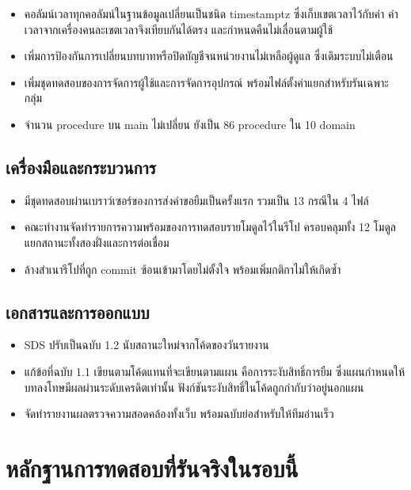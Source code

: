 \begin{itemize}
\item คอลัมน์เวลาทุกคอลัมน์ในฐานข้อมูลเปลี่ยนเป็นชนิด timestamptz ซึ่งเก็บเขตเวลาไว้กับค่า ค่าเวลาจากเครื่องคนละเขตเวลาจึงเทียบกันได้ตรง และกำหนดคืนไม่เลื่อนตามผู้ใช้
\item เพิ่มการป้องกันการเปลี่ยนบทบาทหรือปิดบัญชีจนหน่วยงานไม่เหลือผู้ดูแล ซึ่งเดิมระบบไม่เตือน
\item เพิ่มชุดทดสอบของการจัดการผู้ใช้และการจัดการอุปกรณ์ พร้อมไฟล์ตั้งค่าแยกสำหรับรันเฉพาะกลุ่ม
\item จำนวน procedure บน main ไม่เปลี่ยน ยังเป็น 86 procedure ใน 10 domain
\end{itemize}

\subsection{เครื่องมือและกระบวนการ}

\begin{itemize}
\item มีชุดทดสอบผ่านเบราว์เซอร์ของการส่งคำขอยืมเป็นครั้งแรก รวมเป็น 13 กรณีใน 4 ไฟล์
\item คณะทำงานจัดทำรายการความพร้อมของการทดสอบรายโมดูลไว้ในรีโป ครอบคลุมทั้ง 12 โมดูล แยกสถานะทั้งสองฝั่งและการต่อเชื่อม
\item ล้างสำเนารีโปที่ถูก commit ซ้อนเข้ามาโดยไม่ตั้งใจ พร้อมเพิ่มกติกาไม่ให้เกิดซ้ำ
\end{itemize}

\subsection{เอกสารและการออกแบบ}

\begin{itemize}
\item SDS ปรับเป็นฉบับ 1.2 นับสถานะใหม่จากโค้ดของวันรายงาน
\item แก้ข้อที่ฉบับ 1.1 เขียนตามโค้ดแทนที่จะเขียนตามแผน คือการระงับสิทธิ์การยืม ซึ่งแผนกำหนดให้บทลงโทษมีผลผ่านระดับเครดิตเท่านั้น ฟังก์ชันระงับสิทธิ์ในโค้ดถูกกำกับว่าอยู่นอกแผน
\item จัดทำรายงานผลตรวจความสอดคล้องทั้งเว็บ พร้อมฉบับย่อสำหรับให้ทีมอ่านเร็ว
\end{itemize}

\clearpage
\section{หลักฐานการทดสอบที่รันจริงในรอบนี้}
\label{sec:evidence}

